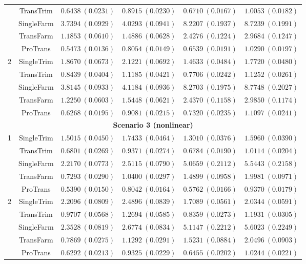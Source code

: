 \documentclass[12pt]{article}
\begin{document}
\begin{table}[!ht]
\begin{tabular}{cccccc}
& TransTrim   & $0.6438\ (0.0231)$ & $0.8915\ (0.0230)$ & $0.6710\ (0.0167)$ & $1.0053\ (0.0182)$ \\
& SingleFarm  & $3.7394\ (0.0929)$ & $4.0293\ (0.0941)$ & $8.2207\ (0.1937)$ & $8.7239\ (0.1991)$ \\
& TransFarm   & $1.1853\ (0.0610)$ & $1.4886\ (0.0628)$ & $2.4276\ (0.1224)$ & $2.9684\ (0.1247)$ \\
& ProTrans    & $\bm{0.5473}\ (0.0136)$ & $\bm{0.8054}\ (0.0149)$ & $\bm{0.6539}\ (0.0191)$ & $\bm{1.0290}\ (0.0197)$ \\
\hline
\multirow{5}{*}{2}
& SingleTrim  & $1.8670\ (0.0673)$ & $2.1221\ (0.0692)$ & $1.4633\ (0.0484)$ & $1.7720\ (0.0480)$ \\
& TransTrim   & $0.8439\ (0.0404)$ & $1.1185\ (0.0421)$ & $0.7706\ (0.0242)$ & $1.1252\ (0.0261)$ \\
& SingleFarm  & $3.8145\ (0.0933)$ & $4.1184\ (0.0936)$ & $8.2703\ (0.1975)$ & $8.7748\ (0.2027)$ \\
& TransFarm   & $1.2250\ (0.0603)$ & $1.5448\ (0.0621)$ & $2.4370\ (0.1158)$ & $2.9850\ (0.1174)$ \\
& ProTrans    & $\bm{0.6268}\ (0.0195)$ & $\bm{0.9081}\ (0.0215)$ & $\bm{0.7320}\ (0.0235)$ & $\bm{1.1097}\ (0.0241)$ \\
        \hline
         \multicolumn{6}{c}{\textbf{Scenario 3 (nonlinear)}}\\
        \hline
        \multirow{5}{*}{1}
& SingleTrim  & $1.5015\ (0.0450)$ & $1.7433\ (0.0464)$  & $1.3010\ (0.0376)$ & $1.5960\ (0.0390)$ \\
& TransTrim   & $0.6801\ (0.0269)$  & $0.9371\ (0.0274)$& $0.6784\ (0.0190)$ & $1.0114\ (0.0204)$ \\
& SingleFarm  & $2.2170\ (0.0773)$ & $2.5115\ (0.0790)$& $5.0659\ (0.2112)$ & $5.5443\ (0.2158)$ \\
& TransFarm   & $0.7293\ (0.0290)$& $1.0400\ (0.0297)$ & $1.4899\ (0.0958)$ & $1.9981\ (0.0971)$\\
& ProTrans    & $\bm{0.5390}\ (0.0150)$ & $\bm{0.8042}\ (0.0164)$  & $\bm{0.5762}\ (0.0166)$ & $\bm{0.9370}\ (0.0179)$  \\
\hline
\multirow{5}{*}{2}
& SingleTrim  & $2.2096\ (0.0809)$ & $2.4896\ (0.0839)$ & $1.7089\ (0.0561)$ & $2.0344\ (0.0591)$  \\
& TransTrim   & $0.9707\ (0.0568)$ & $1.2694\ (0.0585)$ & $0.8359\ (0.0273)$  & $1.1931\ (0.0305)$  \\
& SingleFarm  & $2.3528\ (0.0819)$ & $2.6774\ (0.0834)$ & $5.1147\ (0.2212)$  & $5.6023\ (0.2249)$  \\
& TransFarm   & $0.7869\ (0.0275)$ & $1.1292\ (0.0291)$ & $1.5231\ (0.0884)$  & $2.0496\ (0.0903)$  \\
& ProTrans    & $\bm{0.6292}\ (0.0213)$ & $\bm{0.9325}\ (0.0229)$ & $\bm{0.6455}\ (0.0202)$ & $\bm{1.0244}\ (0.0221)$ \\
        \bottomrule
    \end{tabular}
\end{table}
\end{document}
